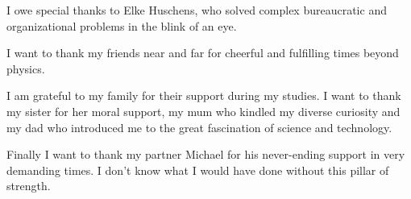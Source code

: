 	I owe special thanks to Elke Huschens, who solved complex bureaucratic and organizational problems in the blink of an eye.

	I want to thank my friends near and far for cheerful and fulfilling times beyond physics. 

	I am grateful to my family for their support during my studies. I want to thank my sister for her moral support, my mum who kindled my diverse curiosity and my dad who introduced me to the great fascination of science and technology.
	
	Finally I want to thank my partner Michael for his never-ending support in very demanding times. I don't know what I would have done without this pillar of strength.

\vfill